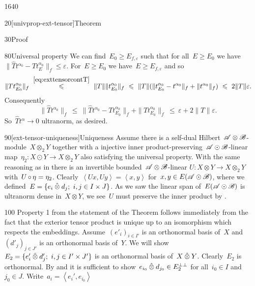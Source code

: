 \begin{parsec}{1640}
\begin{point}{20}[univprop-ext-tensor]{Theorem}
\begin{point}{30}{Proof}
\begin{point}{80}{Universal property}
We can find~$E_0 \geq E_{f,\varepsilon}$
such that for all~$E \geq E_0$
we have~$\| \hat{T} t^{\alpha_0} -T t^{\alpha_0}_E \|_f \leq \varepsilon$.
For~$E \geq E_0$ we have~$E \geq E_{f,\varepsilon}$ and so
\begin{equation*}
 \|T t^{\alpha_0}_{E_0}\|_f
 \  \overset{\eqref{eq:exttensorcontT}}{\leq}\  \|T\| \|t^{\alpha_0}_{E_0}\|_f
  \  \leq\ \|T\|
  ( \|t^{\alpha_0}_{E_0} - t^{\alpha_0}\|_f +
  \| t^{\alpha_0} \|_f)
   \ \leq\  2 \|T\| \varepsilon.
\end{equation*}
    Consequently
\begin{equation*}
    \|\hat{T} t^{\alpha_0} \|_f \ \leq  \ 
    \|\hat{T} t^{\alpha_0} - T t^{\alpha_0}_{E_0} \|_f
                + \|T t^{\alpha_0}_{E_0}\|_f
    \ \leq\  \varepsilon + 2\|T\|\varepsilon.
\end{equation*}
So~$\hat{T}t^\alpha \to 0$ ultranorm, as desired.
\end{point}
\begin{point}{90}[ext-tensor-uniqueness]{Uniqueness}%
Assume there is a self-dual Hilbert~$\scrA\otimes\scrB$-module~$X \otimes_2 Y$
    together with a injective
    inner product-preserving~$\scrA\odot\scrB$-linear
    map~$\eta_2 \colon X \odot Y \to X \otimes_2 Y$
    also satisfying the universal property.
With the same reasoning as in 
    there is an invertible bounded~$\scrA\otimes\scrB$-linear
    $U\colon X \otimes Y \to X \otimes_2 Y$
    with~$U \after \eta = \eta_2$.
Clearly~$\left<Ux, U y\right> = \left<x,y\right>$
    for~$x,y \in E (\scrA\odot\scrB)$,
    where we defined~$E = \{e_i \hotimes d_j; \ i,j \in I\times J\}$.
As we saw the linear span of~$E (\scrA\odot\scrB)$
    is ultranorm dense in~$X \otimes Y$,
    we see~$U$ must preserve the inner product by .
\end{point}
\begin{point}{100}%
Property 1 from the statement of the Theorem follows immediately
    from the fact that the exterior tensor product is unique
    up to an isomorphism which respects the embeddings.
Assume~$(e'_i)_{i \in I'}$ is an orthonormal basis of~$X$
    and~$(d'_j)_{j \in J'}$ is an orthonormal basis of~$Y$.
We will show $E_2 =\{ e'_i \hotimes d'_j; \ i,j \in I'\times J'\}$
is an orthonormal basis of~$X \hotimes Y$.
Clearly~$E_2$ is orthonormal.
By  and 
    it is sufficient to show~$e_{i_0} \hotimes d_{j_0} \in E_2^{\perp\perp}$
    for all~$i_0 \in I$ and $j_0 \in J$.
Write~$a_i = \left<e_i',e_{i_0}\right>$

\end{point}
\end{point}
\end{point}
\end{parsec}
